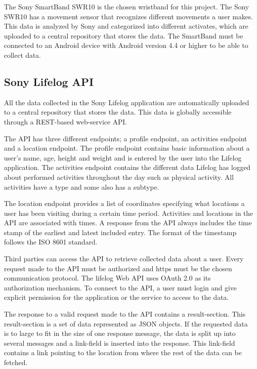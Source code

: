 \documentclass{cslthse-msc}
\begin{document}
The Sony SmartBand SWR10 is the chosen wristband for this project. The Sony SWR10 has a movement sensor that recognizes different movements a user makes\cite{SWR10}. This data is analyzed by Sony and categorized into different activates, which are uploaded to a central repository that stores the data. The SmartBand must be connected to an Android device with Android version 4.4 or higher to be able to collect data.

\subsection{Sony Lifelog API} 
All the data collected in the Sony Lifelog application are automatically uploaded to a central repository that stores the data. This data is globally accessible through a REST-based web-service API\cite{LifeLogDescr}. 

The API has three different endpoints; a profile endpoint, an activities endpoint and a location endpoint. The profile endpoint contains basic information about a user's name, age, height and weight and is entered by the user into the Lifelog application. The activities endpoint contains the different data Lifelog has logged about performed activities throughout the day such as physical activity. All activities have a type and some also has a subtype. 

The location endpoint provides a list of coordinates specifying what locations a user has been visiting during a certain time period. Activities and locations in the API are associated with times. A response from the API always includes the time stamp of the earliest and latest included entry. The format of the timestamp follows the ISO 8601 standard. 

Third parties can access the API to retrieve collected data about a user. Every request made to the API must be authorized and https must be the chosen communication protocol. The lifelog Web API uses OAuth 2.0 as its authorization mechanism. To connect to the API, a user must login and give explicit permission for the application or the service to access to the data. 

The response to a valid request made to the API contains a result-section. This result-section is a set of data represented as JSON objects. If the requested data is to large to fit in the size of one response message, the data is split up into several messages and a link-field is inserted into the response. This link-field contains a link pointing to the location from where the rest of the data can be fetched. 
\end{document}
